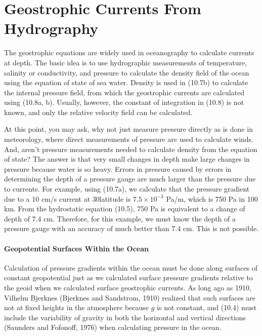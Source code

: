 \section{Geostrophic Currents From Hydrography}
The geostrophic
equations are widely used in oceanography to calculate currents at
depth. The basic idea is to use hydrographic
measurements of temperature, salinity or conductivity, and pressure to
calculate the density field of the ocean using the equation of state
of sea water. Density is used in (10.7b) to calculate the internal
pressure field, from which the geostrophic currents are calculated
using (10.8a, b). Usually, however, the constant of integration in
(10.8) is not known, and only the relative velocity field can be
calculated.

At this point, you may ask, why not just measure pressure directly as
is done in meteorology, where direct measurements of pressure are used
to calculate winds.  And, aren't pressure measurements needed to
calculate density from the equation of state? The answer is that very
small changes in depth make large changes in pressure because water is
so heavy. Errors in pressure caused by errors in determining the depth
of a pressure gauge are much larger than the pressure due to
currents. For example, using (10.7a), we calculate that the pressure
gradient due to a 10 cm/s current at 30\degrees latitude is $7.5
\times 10^{-3}$ Pa/m, which is 750 Pa in 100 km. From the hydrostatic
equation (10.5), 750 Pa is equivalent to a change of depth of 7.4
cm. Therefore, for this example, we must know the depth of a pressure
gauge with an accuracy of much better than
7.4 cm. This is not possible.

\paragraph{Geopotential Surfaces Within the Ocean}
Calculation of pressure gradients within
the ocean must be done along surfaces of constant geopotential just as
we calculated surface pressure gradients relative to the
geoid when we calculated surface geostrophic currents. As
long ago as 1910, Vilhelm Bjerknes (Bjerknes and Sandstrom, 1910)
realized that such surfaces are not at fixed heights in the atmosphere
because $g$ is not constant, and (10.4) must include the variability
of gravity in both the horizontal and vertical directions (Saunders
and Fofonoff, 1976) when calculating pressure in the ocean.

